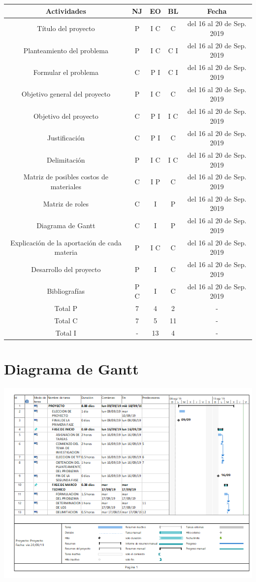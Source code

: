 \documentclass[12pt,a4paper]{report}
\begin{document}
\begin{tabular}{|c|c|c|c|c|}
\hline 
Actividades  & NJ & EO & BL & Fecha  \\ 
\hline 
Título del proyecto  & P & I C & C & del 16 al 20 de Sep. 2019 \\ 
\hline 
Planteamiento del problema  & P & I C & C I & del 16 al 20 de Sep. 2019 \\ 
\hline 
Formular el problema  & C & P I & C I & del 16 al 20 de Sep. 2019 \\ 
\hline 
Objetivo general del proyecto  & P & I C & C & del 16 al 20 de Sep. 2019 \\ 
\hline 
Objetivo del proyecto  & C & P I & I C  & del 16 al 20 de Sep. 2019 \\ 
\hline 
Justificación  & C & P I & C & del 16 al 20 de Sep. 2019 \\ 
\hline 
Delimitación & P & I C & I C & del 16 al 20 de Sep. 2019 \\ 
\hline 
Matriz de posibles costos de materiales  & C & I P  & C & del 16 al 20 de Sep. 2019 \\ 
\hline 
Matriz de roles  & C & I & P & del 16 al 20 de Sep. 2019 \\ 
\hline 
Diagrama de Gantt  & C & I & P & del 16 al 20 de Sep. 2019 \\ 
\hline 
Explicación de la aportación de cada materia  & P & I C & C & del 16 al 20 de Sep. 2019 \\ 
\hline 
Desarrollo del proyecto  & P & I & C & del 16 al 20 de Sep. 2019 \\ 
\hline 
Bibliografías  & P C & I & C & del 16 al 20 de Sep. 2019 \\ 
\hline 
Total P & 7 & 4 & 2 & - \\ 
\hline 
Total C & 7 & 5 & 11 & - \\ 
\hline 
Total I & - & 13 & 4 & - \\ 
\hline 
\end{tabular}

\section{Diagrama de Gantt}
\includegraphics[width=18cm]{Diagrama.png}
\newpage
\end{document}
